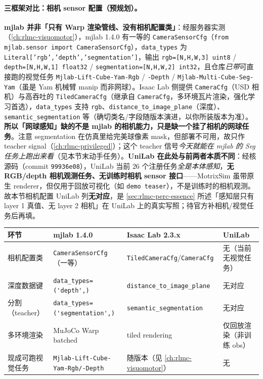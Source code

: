 \paragraph{三框架对比：相机 sensor 配置（预规划）。}\textbf{mjlab 并非「只有 Warp 渲染管线、没有相机配置类」}：经服务器实测（\cref{ch:rlmc-visuomotor}），mjlab 1.4.0 有一等的 \texttt{CameraSensorCfg}（\verb|from mjlab.sensor import CameraSensorCfg|），\texttt{data\_types} 为 \texttt{Literal['rgb','depth','segmentation']}，输出 \texttt{rgb=[N,H,W,3] uint8} / \texttt{depth=[N,H,W,1] float32} / \texttt{segmentation=[N,H,W,2] int32}，且仓库\emph{已带}可直接跑的视觉任务 \verb|Mjlab-Lift-Cube-Yam-Rgb| / \verb|-Depth| / \verb|Mjlab-Multi-Cube-Seg-Yam|（虽是 Yam 机械臂 manip 而非网球）。Isaac Lab 侧提供 \texttt{CameraCfg}（USD 相机）与高吞吐的 \texttt{TiledCameraCfg}（继承自 \texttt{CameraCfg}，多环境瓦片渲染，强化学习首选），\texttt{data\_types} 支持 \texttt{rgb}、\texttt{distance\_to\_image\_plane}（深度）、\texttt{semantic\_segmentation} 等（确切类名/字段随版本演进，以你所装版本为准）。\textbf{所以「网球感知」缺的不是 mjlab 的相机能力，只是缺一个挂了相机的网球任务}。注意 segmentation 在仿真里给完美球像素 mask，但部署不可用，故只作 teacher signal（\cref{ch:rlmc-privileged}）；这个 teacher 信号\emph{今天就能在 mjlab 的 Seg 任务上跑出来看}（见本节末动手任务）。\textbf{UniLab 在此处与前两者本质不同}：经核源码（commit \texttt{99936e08}），UniLab 当前 $26$ 个注册任务\emph{全是本体感知}，\textbf{无 RGB/depth 相机观测任务、无训练时相机 sensor 接口}——MotrixSim 虽带原生 renderer，但仅用于回放可视化（如 \verb|demo teaser|），不是训练时的相机观测。故本节相机配置 UniLab 列\textbf{无对应}，是 \cref{sec:rlmc-perc-essence} 所述「感知层只有 layer 1 真值、无 layer 2 相机」在 UniLab 上的真实写照；待官方补相机/视觉任务后再填。

\begin{center}
\small
\begin{tabular}{@{}llll@{}}
\toprule
环节 & mjlab 1.4.0 & Isaac Lab 2.3.x & UniLab \\
\midrule
相机配置类 & \verb|CameraSensorCfg|（一等） & \verb|TiledCameraCfg|/\verb|CameraCfg| & 无（当前无视觉任务） \\
深度数据键 & \verb|data_types=('depth',)| & \verb|distance_to_image_plane| & 无对应 \\
分割（teacher） & \verb|data_types=('segmentation',)| & \verb|semantic_segmentation| & 无对应 \\
多环境渲染 & MuJoCo Warp batched & tiled rendering & 仅回放渲染（非训练 obs） \\
现成可跑视觉任务 & \verb|Mjlab-Lift-Cube-Yam-Rgb/-Depth| & 随版本（见 \cref{ch:rlmc-visuomotor}） & 无 \\
\bottomrule
\end{tabular}
\end{center}

